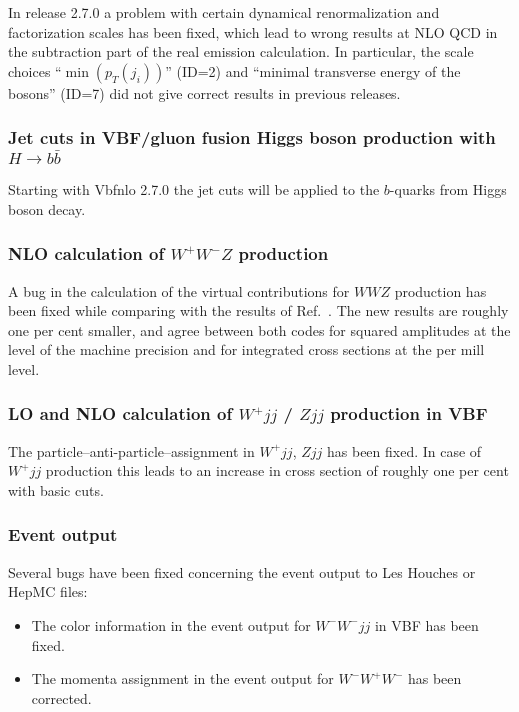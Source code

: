 \documentclass[english,12pt]{article}
\begin{document}
In release 2.7.0 a problem with certain dynamical renormalization and factorization
scales has been fixed, which lead to wrong results at NLO QCD in the subtraction part of the
real emission calculation. In particular, the scale choices ``$\min(p_T(j_i))$'' (ID=2)
and ``minimal transverse energy of the bosons'' (ID=7) did not give correct results
in previous releases.

          
\subsubsection{Jet cuts in VBF/gluon fusion Higgs boson production with $H\to b\bar{b}$}

Starting with {\sc Vbfnlo 2.7.0} the jet cuts will be applied to the
$b$-quarks from Higgs boson decay.


\subsubsection{NLO calculation of $W^+W^-Z$ production}

A bug in the calculation of the virtual contributions for $WWZ$
production has been fixed while comparing with the results of
Ref.~\cite{Nhung:2013jta}.  The new results are roughly one per cent
smaller, and agree between both codes for squared amplitudes at the
level of the machine precision and for integrated cross sections at the
per mill level.


\subsubsection{LO and NLO calculation of $W^+jj$ / $Zjj$ production in VBF}

The particle--anti-particle--assignment in $W^+jj$, $Zjj$ has been fixed.
In case of $W^+jj$ production this leads to an increase in cross section of roughly one per cent with basic cuts.


\subsubsection{Event output}

Several bugs have been fixed concerning the event output to Les Houches or HepMC files:
\begin{itemize}
 \item The color information in the event output for $W^-W^- jj$ in VBF has been fixed.
 \item The momenta assignment in the event output for $W^-W^+W^-$ has been corrected.
\end{itemize}
\end{document}
